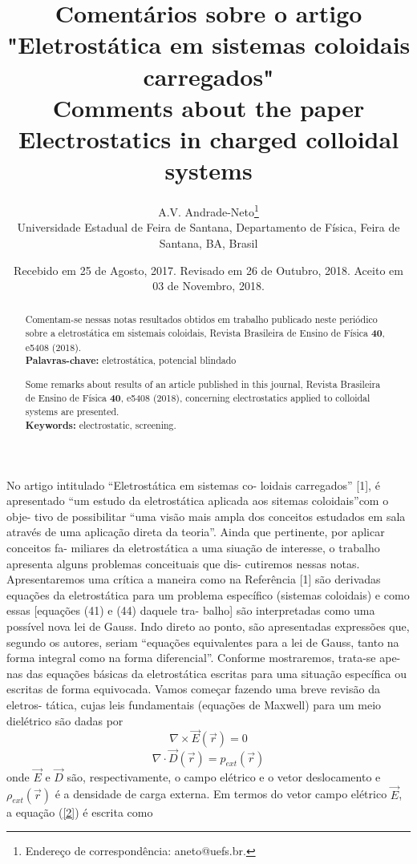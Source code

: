 \documentclass[brazilian,12pt,a4paper]{article}
\title{Comentários sobre o artigo "Eletrostática em sistemas coloidais carregados"\\
\large{Comments about the paper Electrostatics in charged colloidal systems}}
\author{A.V. Andrade-Neto\footnote{Endereço de correspondência: aneto@uefs.br.}\\ {\small Universidade Estadual de Feira de Santana, Departamento de Física, Feira de Santana, BA, Brasil}}
\date{\small{Recebido em 25 de Agosto, 2017. Revisado em 26 de Outubro, 2018. Aceito em 03 de Novembro, 2018.}}
\begin{document}
\renewcommand{\abstractname}{}
\maketitle
\begin{abstract}
Comentam-se nessas notas resultados obtidos em trabalho publicado neste periódico sobre a eletrostática em
sistemais coloidais, Revista Brasileira de Ensino de Física \textbf{40}, e5408 (2018).\\
\textbf{Palavras-chave:} eletrostática, potencial blindado\\
\par
Some remarks about results of an article published in this journal, Revista Brasileira de Ensino de Física \textbf{40},
e5408 (2018), concerning electrostatics applied to colloidal systems are presented.\\
\textbf{Keywords:} electrostatic, screening.\\
\end{abstract}
\begin{multicols}{2}
No artigo intitulado “Eletrostática em sistemas co-
loidais carregados” [1], é apresentado “um estudo da
eletrostática aplicada aos sitemas coloidais”com o obje-
tivo de possibilitar “uma visão mais ampla dos conceitos
estudados em sala através de uma aplicação direta da
teoria”. Ainda que pertinente, por aplicar conceitos fa-
miliares da eletrostática a uma siuação de interesse, o
trabalho apresenta alguns problemas conceituais que dis-
cutiremos nessas notas. Apresentaremos uma crítica a
maneira como na Referência [1] são derivadas equações
da eletrostática para um problema específico (sistemas
coloidais) e como essas [equações (41) e (44) daquele tra-
balho] são interpretadas como uma possível nova lei de
Gauss. Indo direto ao ponto, são apresentadas expressões
que, segundo os autores, seriam “equações equivalentes
para a lei de Gauss, tanto na forma integral como na
forma diferencial”. Conforme mostraremos, trata-se ape-
nas das equações básicas da eletrostática escritas para
uma situação específica ou escritas de forma equivocada.
Vamos começar fazendo uma breve revisão da eletros-
tática, cujas leis fundamentais (equações de Maxwell)
para um meio dielétrico são dadas por
\begin{equation}\label{1}
\nabla\times\vec{E}(\vec{r}) = 0
\end{equation}
\begin{equation}\label{2}
\nabla\cdot\vec{D}(\vec{r}) = p_{ext}(\vec{r}) 
\end{equation}
onde $\vec{E}$ e $\vec{D}$ são, respectivamente, o campo elétrico e o vetor deslocamento
e $\rho_{ext}(\vec{r})$ é a densidade de carga externa. Em termos do vetor campo elétrico
$\vec{E}$, a equação (\ref{2}) é escrita como
\end{multicols}
\end{document}
